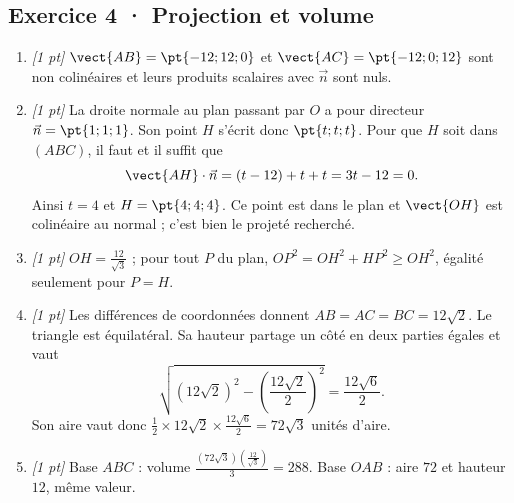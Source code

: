 \subsection*{Exercice 4 · Projection et volume}\begin{enumerate}

\item \textit{[1 pt]} $\vect{AB}=\pt{-12;12;0}$ et $\vect{AC}=\pt{-12;0;12}$ sont non colinéaires et leurs produits scalaires avec $\vec n$ sont nuls.

\item \textit{[1 pt]} La droite normale au plan passant par $O$ a pour directeur $\vec n=\pt{1;1;1}$. Son point $H$ s'écrit donc $\pt{t;t;t}$. Pour que $H$ soit dans $(ABC)$, il faut et il suffit que
\[\vect{AH}\cdot\vec n=(t-12)+t+t=3t-12=0.\]
Ainsi $t=4$ et $H=\pt{4;4;4}$. Ce point est dans le plan et $\vect{OH}$ est colinéaire au normal ; c'est bien le projeté recherché.

\item \textit{[1 pt]} $OH=\frac{12}{\sqrt{3}}$ ; pour tout $P$ du plan, $OP^2=OH^2+HP^2\ge OH^2$, égalité seulement pour $P=H$.

\item \textit{[1 pt]} Les différences de coordonnées donnent $AB=AC=BC=12\sqrt2$. Le triangle est équilatéral. Sa hauteur partage un côté en deux parties égales et vaut
\[\sqrt{(12\sqrt2)^2-(\frac{12\sqrt{2}}{2})^2}=\frac{12\sqrt6}{2}.\]
Son aire vaut donc $\frac12\times 12\sqrt2\times\frac{12\sqrt6}{2}=72\sqrt3$ unités d'aire.

\item \textit{[1 pt]} Base $ABC$ : volume $\frac{(72\sqrt3)(\frac{12}{\sqrt{3}})}{3}=288$. Base $OAB$ : aire $72$ et hauteur $12$, même valeur.

\end{enumerate}

\fi

\fi

